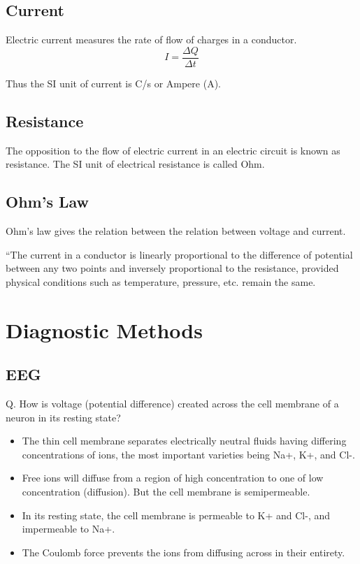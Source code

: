 \documentclass[12pt]{book}
\begin{document}
\subsection{Current}
Electric current measures the rate of flow of charges in a conductor.
$$I = \frac{\Delta Q}{\Delta t} $$

Thus the SI unit of current is C/s or Ampere (A).

\subsection{Resistance}
The opposition to the flow of electric current in an electric circuit is known as resistance. The SI unit of electrical resistance is called Ohm.
\subsection{Ohm's Law}
Ohm's law gives the relation between the relation between voltage and current.
\begin{tcolorbox}[title=Ohm's Law]

“The current in a conductor is linearly proportional to the difference
of potential between any two points and inversely proportional to the
resistance, provided physical conditions such as temperature, pressure, etc. remain the same.
\end{tcolorbox}

\section{Diagnostic Methods}
\subsection{EEG}


\begin{tcolorbox}[title=Supplementary Information]
Q. How is voltage (potential difference) created across the cell membrane of a neuron in its resting state?

\begin{itemize}
\item The thin cell membrane separates electrically neutral fluids having differing concentrations of ions, the most important varieties being Na+, K+, and Cl-.


\item Free ions will diffuse from a region of high concentration to one of low concentration (diffusion). But the cell membrane is semipermeable.

\item In its resting state, the cell membrane is permeable to K+ and Cl-, and impermeable to Na+.

\item The Coulomb force prevents the ions from diffusing across in their entirety.
\end{itemize}

\end{tcolorbox}
\end{document}
